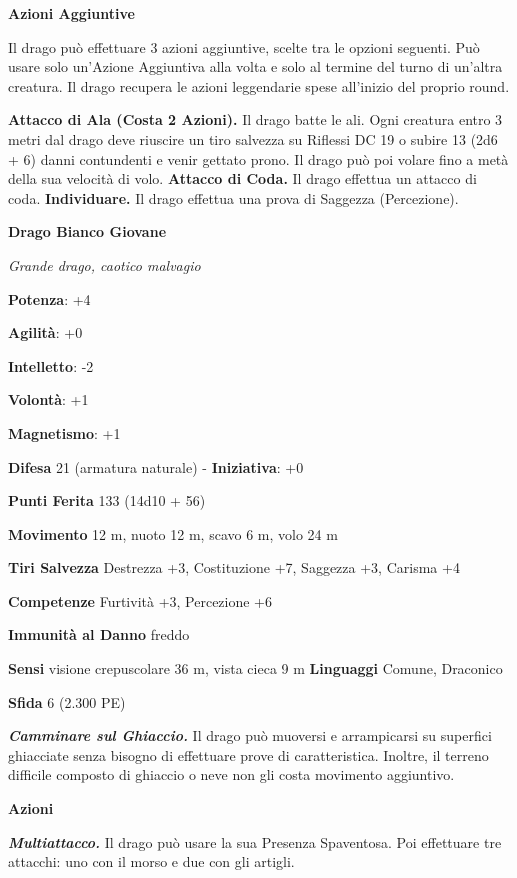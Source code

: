 \begin{multicols}{2}
\textbf{Azioni Aggiuntive}

Il drago può effettuare 3 azioni aggiuntive, scelte tra le opzioni
seguenti. Può usare solo un'Azione Aggiuntiva alla volta e solo al
termine del turno di un'altra creatura. Il drago recupera le azioni
leggendarie spese all'inizio del proprio round.

\textbf{Attacco di Ala (Costa 2 Azioni).} Il drago batte le ali. Ogni
creatura entro 3 metri dal drago deve riuscire un tiro salvezza su Riflessi DC 19 o subire 13 (2d6 + 6) danni contundenti e venir gettato
prono. Il drago può poi volare fino a metà della sua velocità di volo.
\textbf{Attacco di Coda.} Il drago effettua un attacco di coda.
\textbf{Individuare.} Il drago effettua una prova di Saggezza
(Percezione).

\textbf{Drago Bianco Giovane}

\emph{Grande drago, caotico malvagio}

\textbf{Potenza}: +4

\textbf{Agilità}: +0

\textbf{Intelletto}: -2

\textbf{Volontà}: +1

\textbf{Magnetismo}: +1

\textbf{Difesa} 21 (armatura naturale) - \textbf{Iniziativa}: +0

\textbf{Punti Ferita} 133 (14d10 + 56)

\textbf{Movimento} 12 m, nuoto 12 m, scavo 6 m, volo 24 m

\textbf{Tiri Salvezza} Destrezza +3, Costituzione +7, Saggezza +3,
Carisma +4

\textbf{Competenze} Furtività +3, Percezione +6

\textbf{Immunità al Danno} freddo

\textbf{Sensi} visione crepuscolare 36 m, vista cieca 9 m
\textbf{Linguaggi} Comune, Draconico

\textbf{Sfida} 6 (2.300 PE)\smallskip

\emph{\textbf{Camminare sul Ghiaccio.}} Il drago può muoversi e
arrampicarsi su superfici ghiacciate senza bisogno di effettuare prove
di caratteristica. Inoltre, il terreno difficile composto di ghiaccio o
neve non gli costa movimento aggiuntivo.

\smallskip\textbf{Azioni}

\emph{\textbf{Multiattacco.}} Il drago può usare la sua Presenza
Spaventosa. Poi effettuare tre attacchi: uno con il morso e due con gli
artigli.


\end{multicols}
